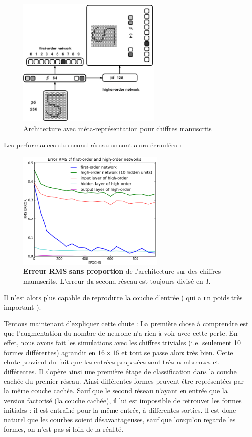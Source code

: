 \documentclass[a4paper,12pt, twoside]{article}
\begin{document}
\begin{figure}[H]
\begin{center}
 \includegraphics[height=240px]{../cleeremans_2007/digit_reco/schema_handwritten.png}
\end{center}
\caption{ Architecture avec méta-représentation pour chiffres manuscrits}
\end{figure}

Les performances du second réseau se sont alors écroulées : 
\begin{figure}[H]
\begin{center}
 \includegraphics[height=220px]{../cleeremans_2007/digit_reco/rms_handwritten_ffa.png}
\end{center}
\caption{ \textbf{Erreur RMS sans proportion} de l'architecture sur des chiffres manuscrits.
L'erreur du second réseau est toujours divisé en 3.}
\end{figure}

Il n'est alors plus capable de reproduire la couche d'entrée ( qui a un poids très important ).


Tentons maintenant d'expliquer cette chute :
\newline La première chose à comprendre est que l'augmentation
du nombre de neurone n'a rien à voir avec cette perte. En effet, nous avons fait les 
simulations avec les chiffres triviales (i.e. seulement 10 formes différentes) agrandit en $16 \times 16$
et tout se passe alors très bien.
\newline
Cette chute provient du fait que les entrées proposées sont très nombreuses et différentes. Il s'opère ainsi
une première étape de classification dans la couche cachée du premier réseau.
Ainsi différentes formes peuvent être représentées par la même couche cachée.
Sauf que le second réseau n'ayant en entrée que la version factorisé (la couche cachée), il lui 
est impossible de retrouver les formes initiales : il est entraîné pour la même entrée, à différentes 
sorties.
Il est donc naturel que les courbes soient désavantageuses, sauf que lorsqu'on regarde les formes, 
on n'est pas si loin de la réalité.
\end{document}
